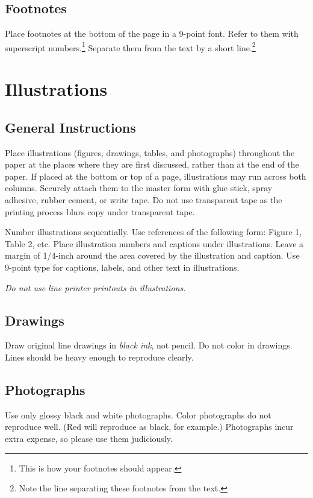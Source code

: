 \subsection{Footnotes}

Place footnotes at the bottom of the page in a 9-point font.  Refer to them
with superscript numbers.\footnote{This is how your footnotes should
appear.} Separate them from the text by a short line.\footnote{Note the
line separating these footnotes from the text.}


\section{Illustrations}

\subsection{General Instructions}

Place illustrations (figures, drawings, tables, and photographs) throughout
the paper at the places where they are first discussed, rather than at the
end of the paper.  If placed at the bottom or top of a page, illustrations
may run across both columns.  Securely attach them to the master form with
glue stick, spray adhesive, rubber cement, or write tape.  Do not use
transparent tape as the printing process blurs copy under transparent tape.

Number illustrations sequentially.  Use references of the following form:
Figure 1, Table 2, etc.  Place illustration numbers and captions under
illustrations.  Leave a margin of 1/4-inch around the area covered by the
illustration and caption.  Use 9-point type for captions, labels, and
other text in illustrations.

{\em Do not use line printer printouts in illustrations.}

\subsection{Drawings}

Draw original line drawings in {\em black ink}, not pencil.  Do not color
in drawings.  Lines should be heavy enough to reproduce clearly.

\subsection{Photographs}

Use only glossy black and white photographs.  Color photographs do not
reproduce well.  (Red will reproduce as black, for example.)  Photographs
incur extra expense, so please use them judiciously.

